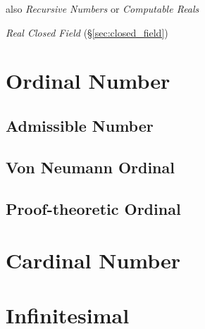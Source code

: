 also \emph{Recursive Numbers} or \emph{Computable Reals}

\emph{Real Closed Field} (\S\ref{sec:closed_field})



\section{Ordinal Number}\label{sec:ordinal_number}

\subsection{Admissible Number}\label{sec:admissible_ordinal}

\subsection{Von Neumann Ordinal}\label{sec:vonneumann_ordinal}

\subsection{Proof-theoretic Ordinal}\label{sec:proof_ordinal}



\section{Cardinal Number}\label{sec:cardinal_number}



\section{Infinitesimal}\label{sec:infinitesimal}



